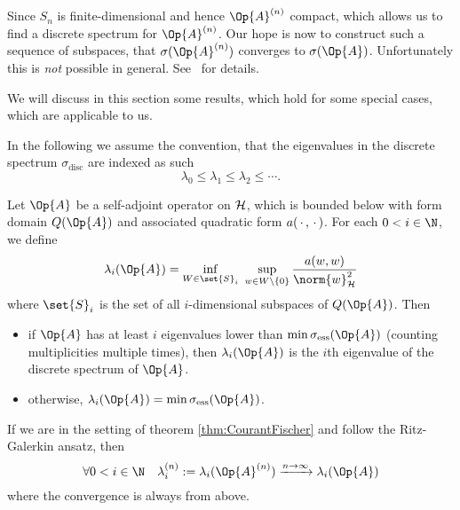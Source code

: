 Since $S_n$ is finite-dimensional and hence $\Op{A}^{(n)}$ compact,
which allows us to find a discrete spectrum for $\Op{A}^{(n)}$.
Our hope is now to construct such a sequence of subspaces,
that $\sigma(\Op{A}^{(n)})$ converges to $\sigma(\Op{A})$.
Unfortunately this is \emph{not} possible in general.
See~\cite{Helffer2013} for details.

We will discuss in this section some results,
which hold for some special cases, which are applicable to us.





In the following we assume the convention,
that the eigenvalues in the discrete spectrum $\sigma_\text{disc}$
are indexed as such
\[ \lambda_0 \leq \lambda_1 \leq \lambda_2 \leq \cdots. \]

\begin{thm}
	\label{thm:CourantFischer}
	Let $\Op{A}$ be a self-adjoint operator on $\mathcal{H}$,
	which is bounded below with form domain $Q(\Op{A})$
	and associated quadratic form $a(\,\cdot\,,\,\cdot\,)$.
	For each $0 < i \in \N$, we define
	\begin{equation}
		\lambda_i(\Op{A}) = \inf_{W \in \set{S}_i} \ \sup_{w \in W \backslash \{0\}}
		\frac{a(w,w)}{\norm{w}_\hilbert^2}
		\label{eqn:CourantFischer}
	\end{equation}
	where $\set{S}_i$ is the set of all $i$-dimensional subspaces of $Q(\Op{A})$.
	Then
	\begin{itemize}
		\item if $\Op{A}$ has at least $i$ eigenvalues lower
			than $\min \sigma_\text{ess}(\Op{A})$ (counting multiplicities multiple times),
			then $\lambda_i(\Op{A})$ is the $i$th eigenvalue of the discrete spectrum
			of $\Op{A}$.
		\item otherwise, $\lambda_i(\Op{A}) = \min \sigma_\text{ess}(\Op{A})$.
	\end{itemize}
\end{thm}

\begin{thm}
	If we are in the setting of theorem \vref{thm:CourantFischer}
	and follow the Ritz-Galerkin ansatz, then
	\[ \forall 0 < i \in \N \quad \lambda^{(n)}_i := \lambda_i(\Op{A}^{(n)}) \xrightarrow{n\to\infty} \lambda_i(\Op{A}) \]
	where the convergence is always from above.
\end{thm}


